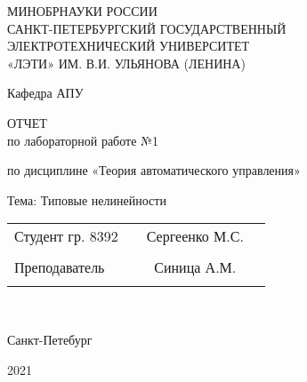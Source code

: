 \begin{titlepage}
\begin{center}
\large
МИНОБРНАУКИ РОССИИ \\
САНКТ-ПЕТЕРБУРГСКИЙ ГОСУДАРСТВЕННЫЙ \\
ЭЛЕКТРОТЕХНИЧЕСКИЙ УНИВЕРСИТЕТ \\
«ЛЭТИ» ИМ. В.И. УЛЬЯНОВА (ЛЕНИНА) \\

\vspace{0.25cm}

Кафедра АПУ


\vfill
\vfill

\textsc{ОТЧЕТ}\\
по лабораторной работе №1

по дисциплине «Теория автоматического управления»

Тема: Типовые нелинейности
\vfill
\vfill

\normalsize{ 
	\begin{tabular}{p{7.67cm} p{4.7cm} cp{5cm}}
		Студент гр. 8392 & \underline{\hspace{4.6cm}} & Сергеенко М.С. \\\\
		Преподаватель & \underline{\hspace{4.6cm}} & Синица А.М. \\\\
	\end{tabular}
}\\
\vfill

	Санкт-Петебург
	
	2021
\end{center}
\end{titlepage}
